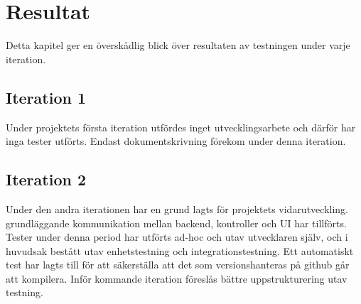 \documentclass[10pt]{article}
\begin{document}
\section{Resultat}
Detta kapitel ger en överskådlig blick över resultaten av testningen under varje iteration.

\subsection{Iteration 1}
Under projektets första iteration utfördes inget utvecklingsarbete och därför har inga tester utförts. Endast dokumentskrivning förekom under denna iteration.
\subsection{Iteration 2}
Under den andra iterationen har en grund lagts för projektets vidarutveckling. grundläggande kommunikation mellan backend, kontroller och UI har tillförts. Tester under denna period har utförts ad-hoc och utav utvecklaren själv, och i huvudsak bestått utav enhetstestning och integrationstestning. Ett automatiskt test har lagts till för att säkerställa att det som versionshanteras på github går att kompilera. Inför kommande iteration föreslås bättre uppstrukturering utav testning.
\end{document}
